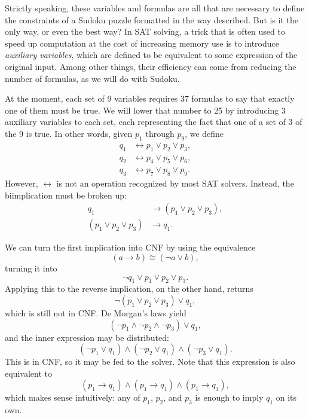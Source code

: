 \documentclass{article}
\begin{document}
Strictly speaking, these variables and formulas are all that are necessary
to define the constraints of a Sudoku puzzle
formatted in the way described.
But is it the only way, or even the best way?
In SAT solving, a trick that is often used to speed up computation
at the cost of increasing memory use
is to introduce \textit{auxiliary variables},
which are defined to be equivalent to some expression of the original input.
Among other things,
their efficiency can come from reducing the number of formulas,
as we will do with Sudoku.

At the moment, each set of 9 variables requires 37 formulas
to say that exactly one of them must be true.
We will lower that number to 25
by introducing 3 auxiliary variables to each set,
each representing the fact that
one of a set of 3 of the 9 is true.
In other words, given $p_1$ through $p_9$,
we define
\begin{align*}
  q_1 &\leftrightarrow p_1 \lor p_2 \lor p_3, \\
  q_2 &\leftrightarrow p_4 \lor p_5 \lor p_6, \\
  q_3 &\leftrightarrow p_7 \lor p_8 \lor p_9.
\end{align*}
However, $\leftrightarrow$ is not an operation recognized by most SAT solvers.
Instead, the biimplication must be broken up:
\begin{align*}
  q_1 &\rightarrow (p_1 \lor p_2 \lor p_3), \\
  (p_1 \lor p_2 \lor p_3) &\rightarrow q_1.
\end{align*}

We can turn the first implication into CNF
by using the equivalence
\[(a \rightarrow b) \cong (\lnot a \lor b),\]
turning it into
\[\lnot q_1 \lor p_1 \lor p_2 \lor p_3.\]
Applying this to the reverse implication, on the other hand, returns
\[\lnot (p_1 \lor p_2 \lor p_3) \lor q_1,\]
which is still not in CNF.
De Morgan's laws yield
\[(\lnot p_1 \land \lnot p_2 \land \lnot p_3) \lor q_1,\]
and the inner expression may be distributed:
\[(\lnot p_1 \lor q_1) \land (\lnot p_2 \lor q_1) \land (\lnot p_3 \lor q_1).\]
This is in CNF, so it may be fed to the solver.
Note that this expression is also equivalent to
\[(p_1 \rightarrow q_1) \land (p_1 \rightarrow q_1) \land (p_1 \rightarrow q_1),\]
which makes sense intuitively:
any of $p_1$, $p_2$, and $p_3$ is enough to imply $q_1$ on its own.
\end{document}
